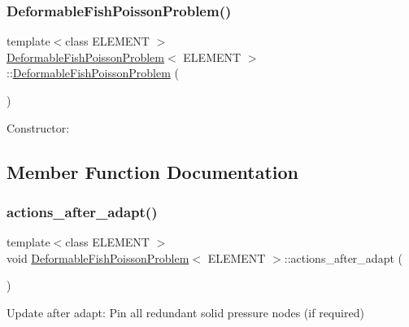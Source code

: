 \subsubsection{\texorpdfstring{Deformable\+Fish\+Poisson\+Problem()}{DeformableFishPoissonProblem()}\hspace{0.1cm}{\footnotesize\ttfamily [2/2]}}
{\footnotesize\ttfamily template$<$class E\+L\+E\+M\+E\+NT $>$ \\
\hyperlink{classDeformableFishPoissonProblem}{Deformable\+Fish\+Poisson\+Problem}$<$ E\+L\+E\+M\+E\+NT $>$\+::\hyperlink{classDeformableFishPoissonProblem}{Deformable\+Fish\+Poisson\+Problem} (\begin{DoxyParamCaption}{ }\end{DoxyParamCaption})}



Constructor\+: 



\subsection{Member Function Documentation}
\mbox{\label{classDeformableFishPoissonProblem_ada340a31a3b019116ecb7c0bb1d4c779}} 
\subsubsection{\texorpdfstring{actions\+\_\+after\+\_\+adapt()}{actions\_after\_adapt()}\hspace{0.1cm}{\footnotesize\ttfamily [1/2]}}
{\footnotesize\ttfamily template$<$class E\+L\+E\+M\+E\+NT $>$ \\
void \hyperlink{classDeformableFishPoissonProblem}{Deformable\+Fish\+Poisson\+Problem}$<$ E\+L\+E\+M\+E\+NT $>$\+::actions\+\_\+after\+\_\+adapt (\begin{DoxyParamCaption}{ }\end{DoxyParamCaption})\hspace{0.3cm}{\ttfamily [inline]}}



Update after adapt\+: Pin all redundant solid pressure nodes (if required) 



